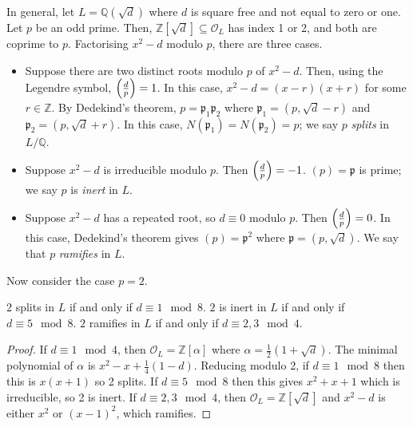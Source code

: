 \begin{example}
    In general, let \( L = \mathbb Q(\sqrt{d}) \) where \( d \) is square free and not equal to zero or one.
    Let \( p \) be an odd prime.
    Then, \( \mathbb Z[\sqrt{d}] \subseteq \mathcal O_L \) has index 1 or 2, and both are coprime to \( p \).
    Factorising \( x^2 - d \) modulo \( p \), there are three cases.
    \begin{itemize}
        \item Suppose there are two distinct roots modulo \( p \) of \( x^2 - d \).
        Then, using the Legendre symbol, \( \qty(\frac{d}{p}) = 1 \).
        In this case, \( x^2 - d = (x-r)(x+r) \) for some \( r \in \mathbb Z \).
        By Dedekind's theorem, \( p = \mathfrak p_1 \mathfrak p_2 \) where \( \mathfrak p_1 = (p, \sqrt{d} - r) \) and \( \mathfrak p_2 = (p, \sqrt{d} + r) \).
        In this case, \( N(\mathfrak p_1) = N(\mathfrak p_2) = p \); we say \( p \) \emph{splits} in \( L/\mathbb Q \).
        \item Suppose \( x^2 - d \) is irreducible modulo \( p \).
        Then \( \qty(\frac{d}{p}) = -1 \).
        \( (p) = \mathfrak p \) is prime; we say \( p \) is \emph{inert} in \( L \).
        \item Suppose \( x^2 - d \) has a repeated root, so \( d \equiv 0 \) modulo \( p \).
        Then \( \qty(\frac{d}{p}) = 0 \).
        In this case, Dedekind's theorem gives \( (p) = \mathfrak p^2 \) where \( \mathfrak p = (p, \sqrt{d}) \).
        We say that \( p \) \emph{ramifies} in \( L \).
    \end{itemize}
\end{example}
Now consider the case \( p = 2 \).
\begin{lemma}
    \( 2 \) splits in \( L \) if and only if \( d \equiv 1 \mod 8 \).
    \( 2 \) is inert in \( L \) if and only if \( d \equiv 5 \mod 8 \).
    \( 2 \) ramifies in \( L \) if and only if \( d \equiv 2, 3 \mod 4 \).
\end{lemma}
\begin{proof}
    If \( d \equiv 1 \mod 4 \), then \( \mathcal O_L = \mathbb Z[\alpha] \) where \( \alpha = \frac{1}{2}(1+\sqrt{d}) \).
    The minimal polynomial of \( \alpha \) is \( x^2 - x + \frac{1}{4}(1-d) \).
    Reducing modulo 2, if \( d \equiv 1 \mod 8 \) then this is \( x(x+1) \) so 2 splits.
    If \( d \equiv 5 \mod 8 \) then this gives \( x^2+x+1 \) which is irreducible, so 2 is inert.
    If \( d \equiv 2, 3 \mod 4 \), then \( \mathcal O_L = \mathbb Z[\sqrt{d}] \) and \( x^2 - d \) is either \( x^2 \) or \( (x-1)^2 \), which ramifies.
\end{proof}
